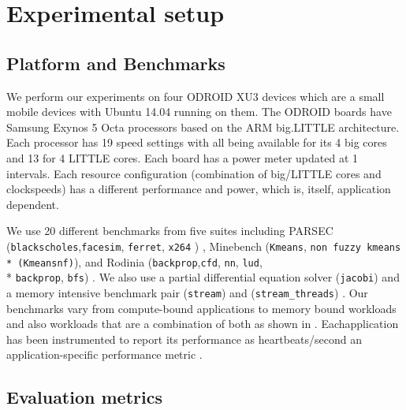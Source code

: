 \section{Experimental setup}

\subsection{Platform and Benchmarks}
We perform our experiments on four ODROID XU3 devices which are a
small mobile devices with Ubuntu 14.04 running on them. The ODROID
boards have Samsung Exynos 5 Octa processors based on the ARM
big.LITTLE architecture.  Each processor has 19 speed settings with
all being available for its 4 big cores and 13 for 4 LITTLE cores.
Each board has a power meter updated at 1 \ms intervals.  Each
resource configuration (combination of big/LITTLE cores and
clockspeeds) has a different performance and power, which is, itself,
application dependent.

We use 20 different benchmarks from five suites including PARSEC
(\texttt{blackscholes},\texttt{facesim}, \texttt{ferret},
\texttt{x264} ) \cite{parsec}, Minebench (\texttt{Kmeans}, \texttt{non
  fuzzy kmeans \\* (Kmeansnf)}), and Rodinia
(\texttt{backprop},\texttt{cfd}, \texttt{nn}, \texttt{lud}, \\*
\texttt{backprop}, \texttt{bfs}) \cite{rodinia}.  We also use a
partial differential equation solver (\texttt{jacobi}) and a memory
intensive benchmark pair (\texttt{stream}) and
(\texttt{stream\_threads}) \cite{stream}. Our benchmarks vary from
compute-bound applications to memory bound workloads and also
workloads that are a combination of both as shown in
.  Eachapplication has been instrumented
to report its performance as heartbeats/second an application-specific
performance metric \cite{POET}.



\subsection{Evaluation metrics}


